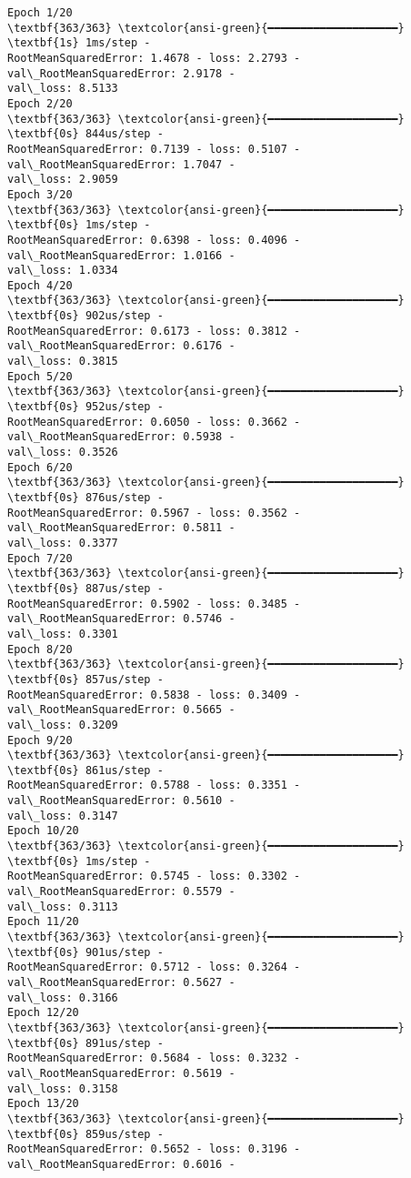 \documentclass[12pt letter]{report}
\begin{document}
    \begin{Verbatim}[commandchars=\\\{\}]
Epoch 1/20
\textbf{363/363} \textcolor{ansi-green}{━━━━━━━━━━━━━━━━━━━━} \textbf{1s} 1ms/step -
RootMeanSquaredError: 1.4678 - loss: 2.2793 - val\_RootMeanSquaredError: 2.9178 -
val\_loss: 8.5133
Epoch 2/20
\textbf{363/363} \textcolor{ansi-green}{━━━━━━━━━━━━━━━━━━━━} \textbf{0s} 844us/step -
RootMeanSquaredError: 0.7139 - loss: 0.5107 - val\_RootMeanSquaredError: 1.7047 -
val\_loss: 2.9059
Epoch 3/20
\textbf{363/363} \textcolor{ansi-green}{━━━━━━━━━━━━━━━━━━━━} \textbf{0s} 1ms/step -
RootMeanSquaredError: 0.6398 - loss: 0.4096 - val\_RootMeanSquaredError: 1.0166 -
val\_loss: 1.0334
Epoch 4/20
\textbf{363/363} \textcolor{ansi-green}{━━━━━━━━━━━━━━━━━━━━} \textbf{0s} 902us/step -
RootMeanSquaredError: 0.6173 - loss: 0.3812 - val\_RootMeanSquaredError: 0.6176 -
val\_loss: 0.3815
Epoch 5/20
\textbf{363/363} \textcolor{ansi-green}{━━━━━━━━━━━━━━━━━━━━} \textbf{0s} 952us/step -
RootMeanSquaredError: 0.6050 - loss: 0.3662 - val\_RootMeanSquaredError: 0.5938 -
val\_loss: 0.3526
Epoch 6/20
\textbf{363/363} \textcolor{ansi-green}{━━━━━━━━━━━━━━━━━━━━} \textbf{0s} 876us/step -
RootMeanSquaredError: 0.5967 - loss: 0.3562 - val\_RootMeanSquaredError: 0.5811 -
val\_loss: 0.3377
Epoch 7/20
\textbf{363/363} \textcolor{ansi-green}{━━━━━━━━━━━━━━━━━━━━} \textbf{0s} 887us/step -
RootMeanSquaredError: 0.5902 - loss: 0.3485 - val\_RootMeanSquaredError: 0.5746 -
val\_loss: 0.3301
Epoch 8/20
\textbf{363/363} \textcolor{ansi-green}{━━━━━━━━━━━━━━━━━━━━} \textbf{0s} 857us/step -
RootMeanSquaredError: 0.5838 - loss: 0.3409 - val\_RootMeanSquaredError: 0.5665 -
val\_loss: 0.3209
Epoch 9/20
\textbf{363/363} \textcolor{ansi-green}{━━━━━━━━━━━━━━━━━━━━} \textbf{0s} 861us/step -
RootMeanSquaredError: 0.5788 - loss: 0.3351 - val\_RootMeanSquaredError: 0.5610 -
val\_loss: 0.3147
Epoch 10/20
\textbf{363/363} \textcolor{ansi-green}{━━━━━━━━━━━━━━━━━━━━} \textbf{0s} 1ms/step -
RootMeanSquaredError: 0.5745 - loss: 0.3302 - val\_RootMeanSquaredError: 0.5579 -
val\_loss: 0.3113
Epoch 11/20
\textbf{363/363} \textcolor{ansi-green}{━━━━━━━━━━━━━━━━━━━━} \textbf{0s} 901us/step -
RootMeanSquaredError: 0.5712 - loss: 0.3264 - val\_RootMeanSquaredError: 0.5627 -
val\_loss: 0.3166
Epoch 12/20
\textbf{363/363} \textcolor{ansi-green}{━━━━━━━━━━━━━━━━━━━━} \textbf{0s} 891us/step -
RootMeanSquaredError: 0.5684 - loss: 0.3232 - val\_RootMeanSquaredError: 0.5619 -
val\_loss: 0.3158
Epoch 13/20
\textbf{363/363} \textcolor{ansi-green}{━━━━━━━━━━━━━━━━━━━━} \textbf{0s} 859us/step -
RootMeanSquaredError: 0.5652 - loss: 0.3196 - val\_RootMeanSquaredError: 0.6016 -

\end{Verbatim}
\end{document}
